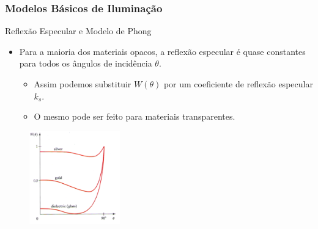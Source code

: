 \documentclass{beamer}
\begin{document}
\begin{frame}
\frametitle{Modelos Básicos de Iluminação}

	\begin{block}{Reflexão Especular e Modelo de Phong}
		\begin{itemize}
			\item Para a maioria dos materiais opacos, a reflexão especular é quase constantes para todos os ângulos de incidência $\theta$.
			\begin{itemize}
				\item Assim podemos substituir $W(\theta)$ por um coeficiente de reflexão especular $k_s$.
				\item O mesmo pode ser feito para materiais transparentes.
			\end{itemize}
		\end{itemize}
	\end{block}
	
	\begin{figure}[!h]
		\begin{center}
		\includegraphics[width=0.35\textwidth]{Figures/Fres}
		\end{center}
	\end{figure}	
\end{frame}
\end{document}
